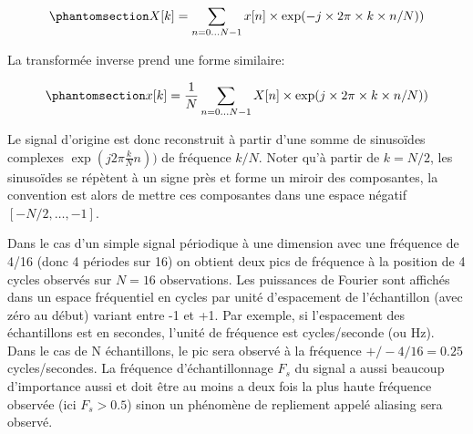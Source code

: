 \documentclass[
  11pt,
  letterpaper,
  open=any,
  twoside=false,
  french]{scrbook}
\begin{document}
\begin{equation}\phantomsection\label{eq-dft}{X[k] = \sum_{n=0 \ldots N-1} x[n] \times \exp(-j \times 2\pi \times k \times n/N))}\end{equation}

La transformée inverse prend une forme similaire:

\begin{equation}\phantomsection\label{eq-idft}{x[k] = \frac{1}{N}\sum_{n=0 \ldots N-1} X[n] \times \exp(j \times 2\pi \times k \times n/N))}\end{equation}

Le signal d'origine est donc reconstruit à partir d'une somme de
sinusoïdes complexes \(\exp(j2\pi \frac{k}{N}n))\) de fréquence \(k/N\).
Noter qu'à partir de \(k=N/2\), les sinusoïdes se répètent à un signe
près et forme un miroir des composantes, la convention est alors de
mettre ces composantes dans une espace négatif \([-N/2,\ldots,-1]\).

Dans le cas d'un simple signal périodique à une dimension avec une
fréquence de 4/16 (donc 4 périodes sur 16) on obtient deux pics de
fréquence à la position de 4 cycles observés sur \(N=16\) observations.
Les puissances de Fourier sont affichés dans un espace fréquentiel en
cycles par unité d'espacement de l'échantillon (avec zéro au début)
variant entre -1 et +1. Par exemple, si l'espacement des échantillons
est en secondes, l'unité de fréquence est cycles/seconde (ou Hz). Dans
le cas de N échantillons, le pic sera observé à la fréquence
\(+/- 4/16=0.25\) cycles/secondes. La fréquence d'échantillonnage
\(F_s\) du signal a aussi beaucoup d'importance aussi et doit être au
moins a deux fois la plus haute fréquence observée (ici \(F_s > 0.5\))
sinon un phénomène de repliement appelé aliasing sera observé.
\end{document}
